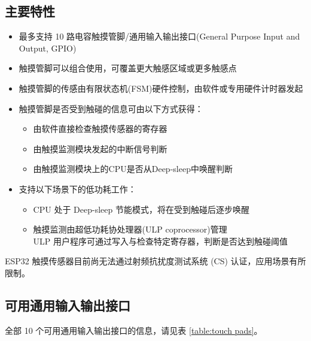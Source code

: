 \documentclass[main\_\_CN.tex]{subfiles}
\begin{document}
\subsection{主要特性}\label{sec:on_chip_sensor_features}

\begin{itemize}
    \item 最多支持 10 路电容触摸管脚/通用输入输出接口(General Purpose Input and Output, GPIO)
    \item 触摸管脚可以组合使用，可覆盖更大触感区域或更多触感点
    \item 触摸管脚的传感由有限状态机(FSM)硬件控制，由软件或专用硬件计时器发起
    \item 触摸管脚是否受到触碰的信息可由以下方式获得：
    \begin{itemize}
        \item 由软件直接检查触摸传感器的寄存器
        \item 由触摸监测模块发起的中断信号判断
        \item 由触摸监测模块上的CPU是否从Deep-sleep中唤醒判断
    \end{itemize}
    \item 支持以下场景下的低功耗工作：
    \begin{itemize}
        \item CPU 处于 Deep-sleep 节能模式，将在受到触碰后逐步唤醒
        \item 触摸监测由超低功耗协处理器(ULP coprocessor)管理 \\
        ULP 用户程序可通过写入与检查特定寄存器，判断是否达到触碰阈值
    \end{itemize}
\end{itemize}

\begin{tiplisting}
ESP32 触摸传感器目前尚无法通过射频抗扰度测试系统 (CS) 认证，应用场景有所限制。
\end{tiplisting}

\subsection{可用通用输入输出接口}

全部 10 个可用通用输入输出接口的信息，请见表 \ref{table:touch pads}。
\end{document}
